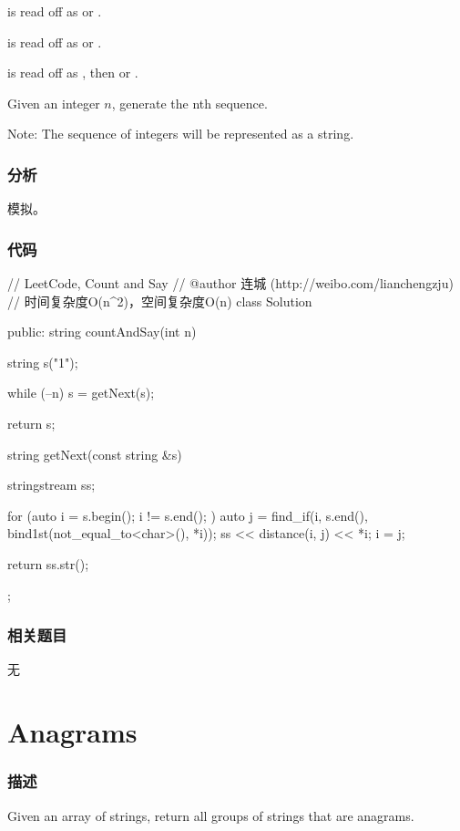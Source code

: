  is read off as  or .

 is read off as  or .

 is read off as , then  or .

Given an integer $n$, generate the nth sequence.

Note: The sequence of integers will be represented as a string.


\subsubsection{分析}
模拟。


\subsubsection{代码}
\begin{Code}
// LeetCode, Count and Say
// @author 连城 (http://weibo.com/lianchengzju)
// 时间复杂度O(n^2)，空间复杂度O(n)
class Solution {
public:
    string countAndSay(int n) {
        string s("1");

        while (--n)
            s = getNext(s);

        return s;
    }

    string getNext(const string &s) {
        stringstream ss;

        for (auto i = s.begin(); i != s.end(); ) {
            auto j = find_if(i, s.end(), bind1st(not_equal_to<char>(), *i));
            ss << distance(i, j) << *i;
            i = j;
        }

        return ss.str();
    }
};
\end{Code}


\subsubsection{相关题目}
\begindot
\item 无
\myenddot


\section{Anagrams} %
\label{sec:anagrams}


\subsubsection{描述}
Given an array of strings, return all groups of strings that are anagrams.


